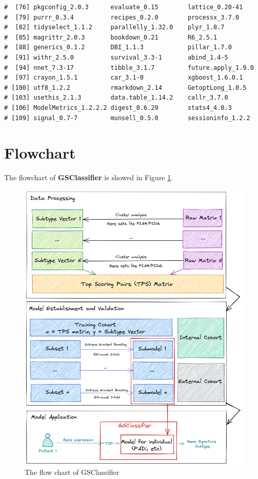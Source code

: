 \documentclass[
  12pt,
]{book}
\begin{document}
\begin{verbatim}
#  [76] pkgconfig_2.0.3      evaluate_0.15        lattice_0.20-41     
#  [79] purrr_0.3.4          recipes_0.2.0        processx_3.7.0      
#  [82] tidyselect_1.1.2     parallelly_1.32.0    plyr_1.8.7          
#  [85] magrittr_2.0.3       bookdown_0.21        R6_2.5.1            
#  [88] generics_0.1.2       DBI_1.1.3            pillar_1.7.0        
#  [91] withr_2.5.0          survival_3.3-1       abind_1.4-5         
#  [94] nnet_7.3-17          tibble_3.1.7         future.apply_1.9.0  
#  [97] crayon_1.5.1         car_3.1-0            xgboost_1.6.0.1     
# [100] utf8_1.2.2           rmarkdown_2.14       GetoptLong_1.0.5    
# [103] usethis_2.1.3        data.table_1.14.2    callr_3.7.0         
# [106] ModelMetrics_1.2.2.2 digest_0.6.29        stats4_4.0.3        
# [109] signal_0.7-7         munsell_0.5.0        sessioninfo_1.2.2
\end{verbatim}

\hypertarget{flowchart}{%
\section{Flowchart}\label{flowchart}}

The flowchart of \textbf{GSClassifier} is showed in Figure \ref{fig:flowchart}.

\begin{figure}

{\centering \includegraphics[width=0.9\linewidth]{./fig/flowchart} 

}

\caption{The flow chart of GSClassifier}\label{fig:flowchart}
\end{figure}
\end{document}
